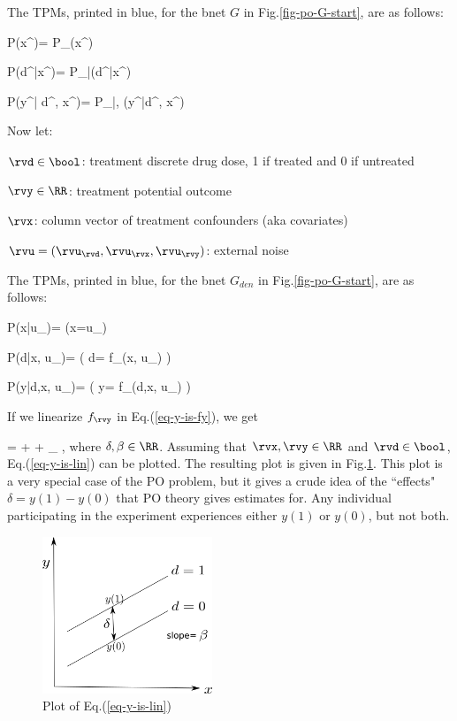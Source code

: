 The TPMs, printed in blue,
for the bnet
$G$
in Fig.\ref{fig-po-G-start},
are as follows:


\beq\color{blue}
P(x^\s)=
P_{\rvx}(x^\s)
\eeq

\beq\color{blue}
P(d^\s|x^\s)=
P_{\rvd|\rvx}(d^\s|x^\s)
\eeq


\beq\color{blue}
P(y^\s| d^\s, x^\s)=
P_{\rvy|\rvd, \rvx}(y^\s|d^\s, x^\s)
\eeq




Now let:

$\rvd\in\bool$: treatment discrete drug dose,  1 if treated and 0 if untreated

$\rvy\in \RR$:
 treatment potential outcome

$\rvx$: column vector of
treatment
confounders (aka covariates)


$\rvu=(\rvu_\rvd, \rvu_\rvx, \rvu_\rvy)$:
external noise

The TPMs, printed in blue,
for the bnet
$G_{den}$
in Fig.\ref{fig-po-G-start},
are as follows:


\beq \color{blue}
P(x|u_\rvx)= \indi(\;\;x=u_\rvx\;\;)
\eeq

\beq\color{blue}
P(d|x, u_\rvd)=
\indi( \;\; d= f_\rvd(x, u_\rvd)
\;\;)
\eeq

\beq\color{blue}
P(y|d,x, u_\rvy)=
\indi( \;\; y= f_\rvy(d,x, u_\rvy)
\;\;)
\label{eq-y-is-fy}
\eeq

If we linearize
 $f_\rvy$ in Eq.(\ref{eq-y-is-fy}),
we get

\beqa
\rvy =
\delta \rvd + \beta \rvx + \rvu_\rvy
\;,
\label{eq-y-is-lin}
\eeqa
where $\delta, \beta\in \RR$.
Assuming
that $\rvx, \rvy\in \RR$
and $\rvd\in \bool$,
Eq.(\ref{eq-y-is-lin}) can be plotted.
The resulting plot
is given in Fig.\ref{fig-po-two-parallel-lines}.
This plot
is a very special
case of the PO problem,
but it gives a crude idea
of the ``effects" $\delta
= y(1)-y(0)$ that PO theory
gives estimates for.
Any
individual participating in the experiment
experiences either $y(1)$
or $y(0)$,
but not both.



\begin{figure}[h!]
\centering
\includegraphics[width=2in]
{pot-out/two-parallel-lines.png}
\caption{Plot  of
Eq.(\ref{eq-y-is-lin})}
\label{fig-po-two-parallel-lines}
\end{figure}




